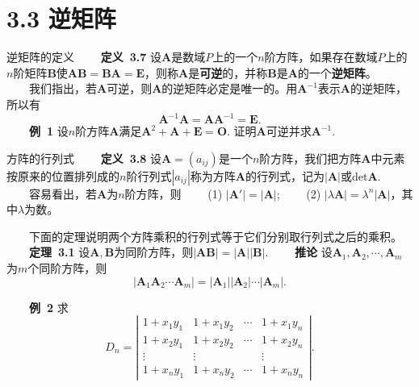 \documentclass[compress,mathserif,cjk]{beamer}
\theoremstyle{remark}
\numberwithin{equation}{section}
\newcommand{\hei}{\bf}      %
\begin{document}
\begin{CJK}{UTF8}{gbsn}
\begin{frame}
\end{frame}

\section[3.3]{3.3 逆矩阵}

\begin{frame}{逆矩阵的定义}
 \ \ \ \ {\hei 定义~3.7} 设$\bm A$是数域$P$上的一个$n$阶方阵，如果存在数域$P$上的$n$阶矩阵$\bm B$使$\bm{AB}=\bm{BA}=\bm E$，则称$\bm A$是{\hei 可逆}的，并称$\bm B$是$\bm A$的一个{\hei 逆矩阵}。
 \pause\vskip 5pt
 \ \ \ \ 我们指出，若$\bm A$可逆，则$\bm A$的逆矩阵必定是唯一的。用$\bm A^{-1}$表示$\bm A$的逆矩阵，所以有
 $$\bm A^{-1}\bm A=\bm A\bm A^{-1}=\bm E.$$
 \pause\vskip 5pt
 \ \ \ \ {\hei 例~1} 设$n$阶方阵$\bm A$满足$\bm A^2+\bm A+\bm E=\bm O$. 证明$\bm A$可逆并求$\bm A^{-1}$.
\end{frame}

\begin{frame}{方阵的行列式}
 \ \ \ \ {\hei 定义~3.8} 设$\bm A=(a_{ij})$是一个$n$阶方阵，我们把方阵$\bm A$中元素按原来的位置排列成的$n$阶行列式$|a_{ij}|$称为方阵$\bm A$的行列式，记为$|\bm A|$或det$\bm A$.
 \pause\vskip 10pt
 \ \ \ \ 容易看出，若$\bm A$为$n$阶方阵，则
 \vskip 5pt
 \ \ \ \ (1) $|\bm A'|=|\bm A|$;
 \vskip 5pt
 \ \ \ \ (2) $|\lambda\bm A|=\lambda^n|\bm A|$，其中$\lambda$为数。
\end{frame}

\begin{frame}
 \ \ \ \ 下面的定理说明两个方阵乘积的行列式等于它们分别取行列式之后的乘积。
 \vskip 5pt
 \ \ \ \ {\hei 定理~3.1} 设$\bm A,\bm B$为同阶方阵，则$|\bm A\bm B|=|\bm A||\bm B|$.
 \pause\vskip 10pt
  \ \ \ \ {\hei 推论} 设$\bm A_1,\bm A_2,\cdots,\bm A_m$为$m$个同阶方阵，则
  $$|\bm A_1\bm A_2\cdots\bm A_m|=|\bm A_1||\bm A_2|\cdots|\bm A_m|.$$

\end{frame}

\begin{frame}
  \ \ \ \ {\hei 例~2} 求
  $$D_n=\left|\begin{matrix}1+x_1y_1&1+x_1y_2&\cdots&1+x_1y_n\\1+x_2y_1&1+x_2y_2&\cdots&1+x_2y_n\\ \vdots&\vdots&&\vdots\\1+x_ny_1&1+x_ny_2&\cdots&1+x_ny_n\end{matrix}\right|.$$
\end{frame}


\end{CJK}
\end{document}
